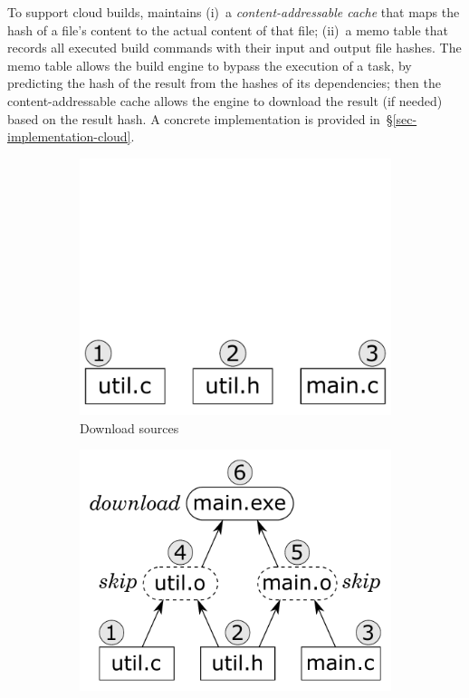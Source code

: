 To support cloud builds, \Bazel maintains (i)~a \emph{content-addressable cache}
that maps the hash of a file's content to the actual content of that file;
(ii)~a memo table that records all executed build commands
with their input and output file hashes.
The memo table allows the build engine to bypass the execution
of a task, by predicting the hash of the result from the hashes of its
dependencies; then the content-addressable cache allows the engine
to download the result (if needed) based on the result hash. A concrete
implementation is provided in~\S\ref{sec-implementation-cloud}.

\begin{figure}
\begin{subfigure}[b]{0.25\linewidth}
\centerline{\includegraphics[scale=0.28]{fig/bazel-example-checkout.pdf}}
\vspace{-0.5mm}
\caption{Download sources}
\end{subfigure}
\begin{subfigure}[b]{0.40\linewidth}
\centerline{\includegraphics[scale=0.28]{fig/bazel-example-build.pdf}}

\end{subfigure}
\end{figure}
